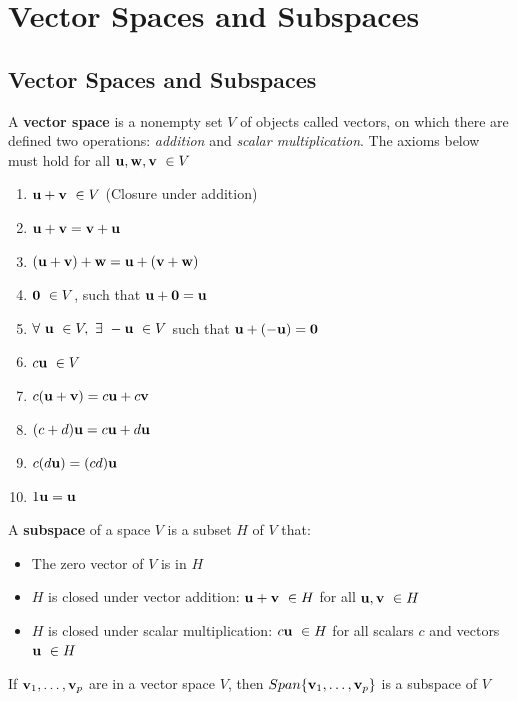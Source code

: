 \documentclass{report}
\begin{document}
\chapter{Vector Spaces and Subspaces}

\section{Vector Spaces and Subspaces}

\begin{definition}
    A \textbf{vector space} is a nonempty set $V$ of objects called vectors, on which there are defined two operations:
    \textit{addition} and \textit{scalar multiplication}. The axioms below must hold for all $\mathbf{u}, \mathbf{w}, \mathbf{v} \ \in V$
\end{definition}
\begin{tcolorbox}[colback=blue!5!white, colframe=blue!75!black]
\begin{enumerate}
    \item $\mathbf{u} + \mathbf{v} \ \in V$ (Closure under addition)
    \item $\mathbf{u} + \mathbf{v} = \mathbf{v} + \mathbf{u}$
    \item $(\mathbf{u} + \mathbf{v}) + \mathbf{w} = \mathbf{u} + (\mathbf{v} + \mathbf{w})$
    \item $\mathbf{0} \ \in V$, such that $\mathbf{u} + \mathbf{0} = \mathbf{u}$
    \item $\forall \ \uu \ \in V, \ \exists \ -\uu \ \in V$ such that $\mathbf{u} + (-\mathbf{u}) = \mathbf{0}$
    \item $c \mathbf{u} \ \in V$
    \item $c (\mathbf{u} + \mathbf{v}) = c \mathbf{u} + c \mathbf{v}$
    \item $(c + d) \mathbf{u} = c \mathbf{u} + d \mathbf{u}$
    \item $c (d \mathbf{u}) = (c d) \mathbf{u}$
    \item $1 \mathbf{u} = \mathbf{u}$
\end{enumerate}
\end{tcolorbox}

\begin{definition}
    A \textbf{subspace} of a space $V$ is a subset $H$ of $V$ that:
    \begin{itemize}
        \item The zero vector of $V$ is in $H$
        \item $H$ is closed under vector addition: $\uu + \vv \ \in H$ for all $\mathbf{u}, \mathbf{v} \ \in H$
        \item $H$ is closed under scalar multiplication: $c\uu \ \in H$ for all scalars $c$ and vectors $\mathbf{u}\ \in H$
    \end{itemize}
\end{definition}

\begin{theorem}
    If $\mathbf{v}_1, \ldots, \mathbf{v}_p$ are in a vector space $V$, then $Span \{\mathbf{v}_1, \ldots, \mathbf{v}_p\}$ is a subspace of $V$
\end{theorem}
\end{document}
